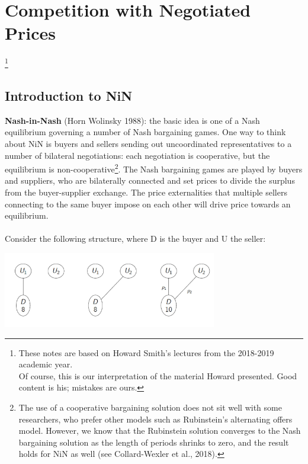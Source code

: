 \documentclass[11pt]{article}
\numberwithin{equation}{section}
\newcommand\blfootnote[1]{%
	\begingroup
	\renewcommand\thefootnote{}\footnote{#1}%
	\addtocounter{footnote}{-1}%
	\endgroup
}
\begin{document}
\onehalfspacing

\section{Competition with Negotiated Prices}
\blfootnote{These notes are based on Howard Smith's lectures from the 2018-2019 academic year.\\
Of course, this is our interpretation of the material Howard presented. Good content is his; mistakes are ours.}

\vspace{-1cm}

\subsection{Introduction to NiN}

\textbf{Nash-in-Nash} (Horn Wolinsky 1988): the basic idea is one of a Nash equilibrium governing a number of Nash bargaining games. One way to think about NiN is buyers and sellers sending out uncoordinated representatives to a number of bilateral negotiations: each negotiation is cooperative, but the equilibrium is non-cooperative\footnote{The use of a cooperative bargaining solution does not sit well with some researchers, who prefer other models such as Rubinstein's alternating offers model. However, we know that the Rubinstein solution converges to the Nash bargaining solution as the length of periods shrinks to zero, and the result holds for NiN as well (see Collard-Wexler et al., 2018).}. The Nash bargaining games are played by buyers and suppliers, who are bilaterally connected and set prices to divide the surplus from the buyer-supplier exchange. The price externalities that multiple sellers connecting to the same buyer impose on each other will drive price towards an equilibrium. \\\\
Consider the following structure, where D is the buyer and U the seller:

\begin{center}
	\includegraphics[width = 0.7\textwidth]{l2p1}
\end{center}
\end{document}
